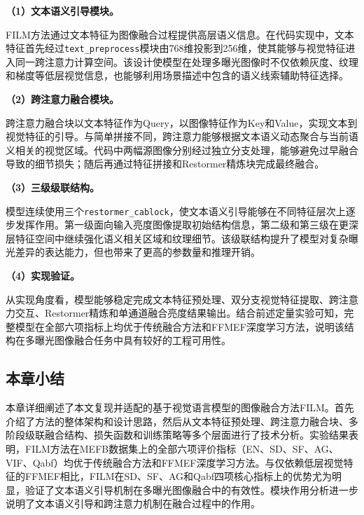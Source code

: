 \textbf{（1）文本语义引导模块。}

FILM方法通过文本特征为图像融合过程提供高层语义信息。在代码实现中，文本特征首先经过\texttt{text\_preprocess}模块由768维投影到256维，使其能够与视觉特征进入同一跨注意力计算空间。该设计使模型在处理多曝光图像时不仅依赖灰度、纹理和梯度等低层视觉信息，也能够利用场景描述中包含的语义线索辅助特征选择。

\textbf{（2）跨注意力融合模块。}

跨注意力融合块以文本特征作为Query，以图像特征作为Key和Value，实现文本到视觉特征的引导。与简单拼接不同，跨注意力能够根据文本语义动态聚合与当前语义相关的视觉区域。代码中两幅源图像分别经过独立分支处理，能够避免过早融合导致的细节损失；随后再通过特征拼接和Restormer精炼块完成最终融合。

\textbf{（3）三级级联结构。}

模型连续使用三个\texttt{restormer\_cablock}，使文本语义引导能够在不同特征层次上逐步发挥作用。第一级面向输入亮度图像提取初始结构信息，第二级和第三级在更深层特征空间中继续强化语义相关区域和纹理细节。该级联结构提升了模型对复杂曝光差异的表达能力，但也带来了更高的参数量和推理开销。

\textbf{（4）实现验证。}

从实现角度看，模型能够稳定完成文本特征预处理、双分支视觉特征提取、跨注意力交互、Restormer精炼和单通道融合亮度结果输出。结合前述定量实验可知，完整模型在全部六项指标上均优于传统融合方法和FFMEF深度学习方法，说明该结构在多曝光图像融合任务中具有较好的工程可用性。

\subsection{本章小结}\label{sec:ch3_summary}

本章详细阐述了本文复现并适配的基于视觉语言模型的图像融合方法FILM。首先介绍了方法的整体架构和设计思路，然后从文本特征预处理、跨注意力融合块、多阶段级联融合结构、损失函数和训练策略等多个层面进行了技术分析。实验结果表明，FILM方法在MEFB数据集上的全部六项评价指标（EN、SD、SF、AG、VIF、Qabf）均优于传统融合方法和FFMEF深度学习方法。与仅依赖低层视觉特征的FFMEF相比，FILM在SD、SF、AG和Qabf四项核心指标上的优势尤为明显，验证了文本语义引导机制在多曝光图像融合中的有效性。模块作用分析进一步说明了文本语义引导和跨注意力机制在融合过程中的作用。
